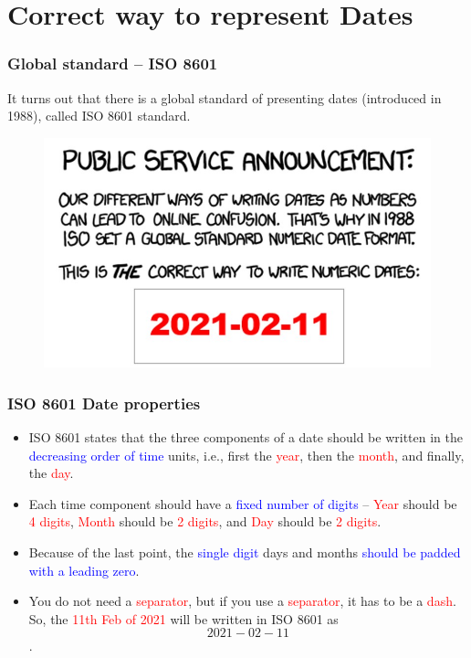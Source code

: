 \documentclass{beamer}
\begin{document}
\section{Correct way to represent Dates}
\begin{frame}\frametitle{Global standard -- ISO 8601}
It turns out that there is a global standard of presenting dates (introduced in 1988), called ISO 8601 standard.
\begin{figure}
\includegraphics[width=0.99\linewidth]{PlotsLec4/ISO}
\end{figure}
\end{frame}

\begin{frame}\frametitle{ISO 8601 Date properties}
\begin{itemize}
\item ISO 8601 states that the three components of a date should be written in the \textcolor{blue}{decreasing order of time} units, i.e., first the \textcolor{red}{year}, then the \textcolor{red}{month}, and finally, the \textcolor{red}{day}.
\vspace{0.15in}

\item<2-> Each time component should have a \textcolor{blue}{fixed number of digits} -- \textcolor{red}{Year} should be \textcolor{red}{4 digits}, \textcolor{red}{Month} should be \textcolor{red}{2 digits}, and \textcolor{red}{Day} should be \textcolor{red}{2 digits}.
\vspace{0.15in}

\item<3-> Because of the last point, the \textcolor{blue}{single digit} days and months \textcolor{blue}{should be padded with a leading zero}.
\vspace{0.15in}

\item<4-> You do not need a \textcolor{red}{separator}, but if you use a \textcolor{red}{separator}, it has to be a \textcolor{red}{dash}. So, the \textcolor{red}{11th Feb of 2021} will be written in ISO 8601 as $$2021-02-11$$.
\end{itemize}
\end{frame}
\end{document}
